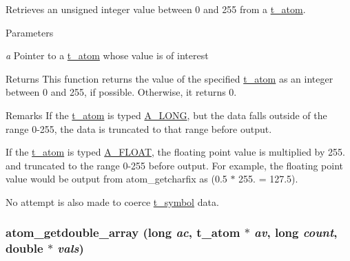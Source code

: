 Retrieves an unsigned integer value between 0 and 255 from a \hyperlink{structt__atom}{t\_\-atom}. 
\begin{DoxyParams}{Parameters}
\item[{\em a}]Pointer to a \hyperlink{structt__atom}{t\_\-atom} whose value is of interest \end{DoxyParams}
\begin{DoxyReturn}{Returns}
This function returns the value of the specified \hyperlink{structt__atom}{t\_\-atom} as an integer between 0 and 255, if possible. Otherwise, it returns 0.
\end{DoxyReturn}
\begin{DoxyRemark}{Remarks}
If the \hyperlink{structt__atom}{t\_\-atom} is typed \hyperlink{group__atom_gga8aa6700e9f00b132eb376db6e39ade47a002f28879581a6f66ea492b994b96f1e}{A\_\-LONG}, but the data falls outside of the range 0-\/255, the data is truncated to that range before output.

If the \hyperlink{structt__atom}{t\_\-atom} is typed \hyperlink{group__atom_gga8aa6700e9f00b132eb376db6e39ade47a0b3aa0ab8104573dfc9cb70b5b08031f}{A\_\-FLOAT}, the floating point value is multiplied by 255. and truncated to the range 0-\/255 before output. For example, the floating point value {} would be output from atom\_\-getcharfix as {} (0.5 $\ast$ 255. = 127.5).

No attempt is also made to coerce \hyperlink{structt__symbol}{t\_\-symbol} data. 
\end{DoxyRemark}
\hypertarget{group__atom_ga4189a7d83f7cf03d575425ba97f0e9f9}{
\subsubsection[{atom\_\-getdouble\_\-array}]{ atom\_\-getdouble\_\-array (long {\em ac}, \/  {\bf t\_\-atom} $\ast$ {\em av}, \/  long {\em count}, \/  double $\ast$ {\em vals})}}
\label{group__atom_ga4189a7d83f7cf03d575425ba97f0e9f9}


